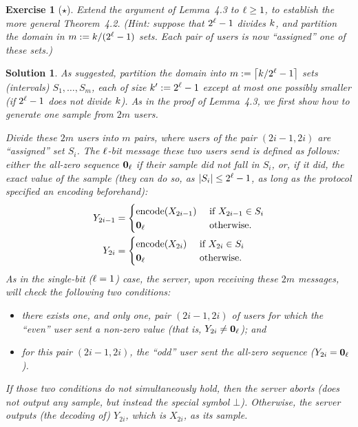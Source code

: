 \documentclass[biber]{nowfnt} %
\newtheorem{question}{Exercise}[chapter]
\newtheorem{solution}{Solution}[chapter]
\begin{document}
\begin{question}[$\star$]\label{exo:simulate:infer}
Extend the argument of Lemma~4.3 to $\ell\geq 1$, to establish the more general Theorem~4.2. \emph{(Hint: suppose that $2^\ell -1$ divides $k$, and partition the domain in $m:= k/(2^\ell -1)$ sets. Each pair of users is now ``assigned'' one of these sets.)}
\end{question}
\begin{solution}
As suggested, partition the domain into $m\eqdef \clg{\ab/2^\numbits -1}$ sets (\eg intervals) $S_1,\dots, S_m$, each of size $k' := 2^\ell -1$ except at most one possibly smaller (if $2^\ell -1$ does not divide $k$). As in the proof of Lemma~4.3, we first show how to generate one sample from $2m$ users.

Divide these $2m$ users into $m$ pairs, where users of the pair $(2i-1, 2i)$ are ``assigned'' set $S_i$. The $\ell$-bit message these two users send is defined as follows: either the all-zero sequence $\textbf{0}_\ell$ if their sample did not fall in $S_i$, or, if it did, the exact value of the sample (they can do so, as $|S_i| \leq 2^\ell -1$, as long as the protocol specified an encoding beforehand):
\begin{align*}
	Y_{2i-1} &= 
		\begin{cases}
			\textrm{encode}(X_{2i-1}) &\text{ if } X_{2i-1} \in S_i\\
			\textbf{0}_\ell &\text{ otherwise.}
		\end{cases} \\
	Y_{2i} &= 
		\begin{cases}
			\textrm{encode}(X_{2i}) &\text{ if } X_{2i} \in S_i\\
			\textbf{0}_\ell &\text{ otherwise.}
		\end{cases}
\end{align*}
As in the single-bit ($\ell=1$) case, the server, upon receiving these $2m$ messages, will check the following
two conditions:
\begin{itemize}
	\item there exists one, and only one, pair $(2i - 1, 2i)$ of users for which the ``even'' user sent a non-zero value (that is, $Y_{2i}\neq  \textbf{0}_\ell$); and
	\item for this pair $(2i - 1, 2i)$, the ``odd'' user sent the all-zero sequence ($Y_{2i}=\textbf{0}_\ell$).
\end{itemize}
If those two conditions do not simultaneously hold, then the server aborts (does not output any sample, but instead the special symbol $\bot$). Otherwise, the server outputs (the decoding of) $Y_{2i}$, which is $X_{2i}$, as its sample.

\end{solution}
\end{document}
